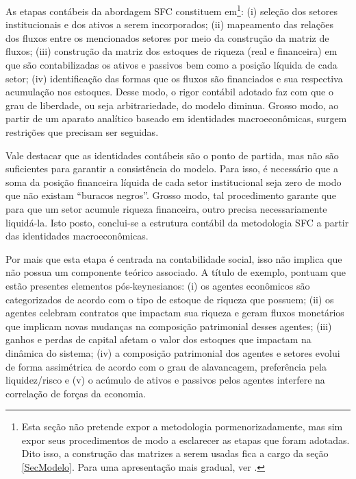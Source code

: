 As etapas contábeis da abordagem SFC constituem em\footnote{Esta seção não pretende expor a metodologia pormenorizadamente, mas sim expor seus procedimentos de modo a esclarecer as etapas que foram adotadas. Dito isso, a construção das matrizes a serem usadas fica a cargo da seção \ref{SecModelo}. Para uma apresentação mais gradual, ver \textcite[Capítulo 4]{da_silveira_politica_2017}.}: (i) seleção dos setores institucionais e dos ativos a serem incorporados; (ii) mapeamento das relações dos fluxos entre os mencionados setores por meio da construção da matriz de fluxos; (iii) construção da matriz dos estoques de riqueza (real e financeira) em que são contabilizadas os ativos e passivos  bem como a posição líquida de cada setor; (iv) identificação das formas que os fluxos são financiados e sua respectiva acumulação nos estoques. Desse modo, o rigor contábil adotado faz com que o grau de liberdade, ou seja arbitrariedade, do modelo diminua. 
Grosso modo, ao partir de um aparato analítico baseado em identidades macroeconômicas, surgem restrições que precisam ser seguidas.

Vale destacar que as identidades contábeis são o ponto de partida, mas não são suficientes para garantir a consistência do modelo. Para isso, é necessário que a soma da posição financeira líquida de cada setor institucional seja zero de modo que não existam ``buracos negros''. Grosso modo, tal procedimento garante que para que um setor acumule riqueza financeira, outro precisa necessariamente liquidá-la. Isto posto, conclui-se a estrutura contábil da metodologia SFC a partir das identidades macroeconômicas. 

Por mais que esta etapa é centrada na contabilidade social, isso não implica que não possua um componente teórico associado. A título de exemplo, \textcite[p.~15--16]{macedo_e_silva_peering_2011}  pontuam que estão presentes elementos pós-keynesianos: (i) os agentes econômicos são categorizados de acordo com o tipo de estoque de riqueza que possuem; (ii) os agentes celebram contratos que impactam sua riqueza e geram fluxos monetários que implicam novas mudanças na composição patrimonial desses agentes; (iii) ganhos e perdas de capital afetam o valor dos estoques que impactam na dinâmica do sistema; (iv) a composição patrimonial dos agentes e setores evolui de forma assimétrica de acordo com o grau de alavancagem, preferência
pela liquidez/risco e (v) o acúmulo de ativos e passivos pelos agentes interfere na correlação de forças da economia. 

